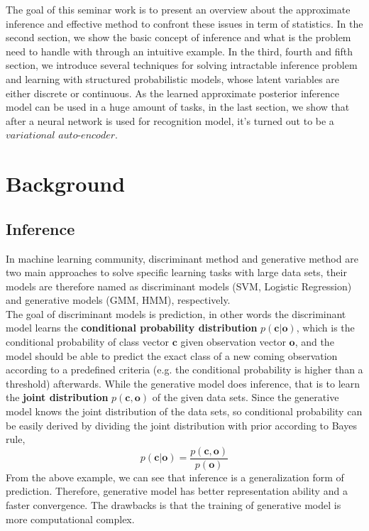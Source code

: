 \documentclass[conference]{IEEEtran}
\begin{document}
The goal of this seminar work is to present an overview about the approximate inference and effective method to confront these issues in term of statistics. In the second section, we show the basic concept of inference and what is the problem need to handle with through an intuitive example. In the third, fourth and fifth section, we introduce several techniques for solving intractable inference problem and learning with structured probabilistic models, whose latent variables are either discrete or continuous. As the learned approximate posterior inference model can be used in a huge amount of tasks, in the last section, we show that after a neural network is used for recognition model, it's turned out to be a $variational$ $auto$-$encoder$.

\section{Background}
\subsection{Inference}
In machine learning community, discriminant method and generative method are two main approaches to solve specific learning tasks with large data sets, their models are therefore named as discriminant models (SVM, Logistic Regression) and generative models (GMM, HMM), respectively. \\

The goal of discriminant models is prediction, in other words the discriminant model learns the \textbf{conditional probability distribution} $p(\boldsymbol{c} | \boldsymbol{o})$, which is the conditional probability of class vector $\boldsymbol{c}$ given observation vector $\boldsymbol{o}$, and the model should be able to predict the exact class of a new coming observation according to a predefined criteria (e.g. the conditional probability is higher than a threshold) afterwards. While the generative model does inference, that is to learn the \textbf{joint distribution} $p(\boldsymbol{c},\boldsymbol{o})$ of the given data sets. Since the generative model knows the joint distribution of the data sets, so conditional probability can be easily derived by dividing the joint distribution with prior according to Bayes rule, 
\begin{equation}
p(\boldsymbol{c} | \boldsymbol{o}) = \frac{p(\boldsymbol{c}, \boldsymbol{o})}{p(\boldsymbol{o})}
\end{equation} From the above example, we can see that inference is a generalization form of prediction. Therefore, generative model has better representation ability and a faster convergence. The drawbacks is that the training of generative model is more computational complex.\\
\end{document}
